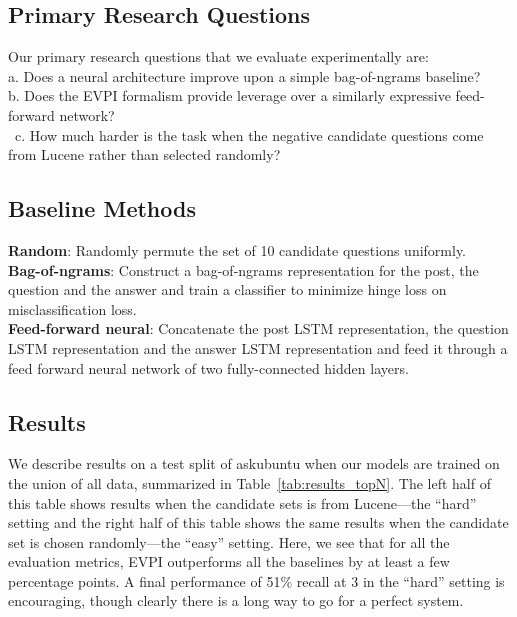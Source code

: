 \documentclass[11pt,a4paper]{article}
\begin{document}
\subsection{Primary Research Questions}\label{experiments_results}
Our primary research questions that we evaluate experimentally are:\\
a. Does a neural architecture improve upon a simple bag-of-ngrams baseline?\\
b. Does the EVPI formalism provide leverage over a similarly expressive feed-forward network?\\\
c. How much harder is the task when the negative candidate questions come from Lucene rather than selected randomly?

\subsection{Baseline Methods}\label{baselines}

\textbf{Random}: Randomly permute the set of 10 candidate questions uniformly.\\
\textbf{Bag-of-ngrams}: Construct a bag-of-ngrams representation for the post, the question and the answer and train a classifier to minimize hinge loss on misclassification loss. \\
\textbf{Feed-forward neural}: Concatenate the post LSTM representation, the question LSTM representation and the answer LSTM representation and feed it through a feed forward neural network of two fully-connected hidden layers.

\subsection{Results}

We describe results on a test split of askubuntu when our models are trained on the union of all data, summarized in Table~\ref{tab:results_topN}. The left half of this table shows results when the candidate sets is from Lucene---the ``hard'' setting and the right half of this table shows the same results when the candidate set is chosen randomly---the ``easy'' setting. Here, we see that for all the evaluation metrics, EVPI outperforms all the baselines by at least a few percentage points. A final performance of 51\% recall at 3 in the ``hard'' setting is encouraging, though clearly there is a long way to go for a perfect system. 
\end{document}
